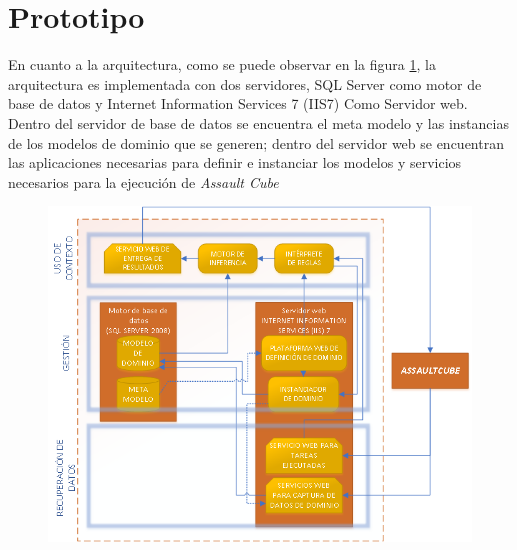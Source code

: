 \section{Prototipo}

En cuanto a la arquitectura, como se puede observar en la figura \ref{imp:Implementacion}, la arquitectura es implementada con dos servidores, SQL Server como motor de base de datos y Internet Information Services 7 (IIS7) Como Servidor web. Dentro del servidor de base de datos se encuentra el  meta modelo y las instancias de los modelos de dominio que se generen; dentro del servidor web se encuentran las aplicaciones necesarias para definir e instanciar los modelos y servicios necesarios para la ejecuci\'on de \textit{Assault Cube}

\begin{figure}[h]
\centering
\includegraphics[width=0.7\linewidth]{./images/arquitecturaImplementacion}
\caption[Arquitectura de implementaci\'on]{}
\caption{}
\label{imp:Implementacion}
\end{figure}

